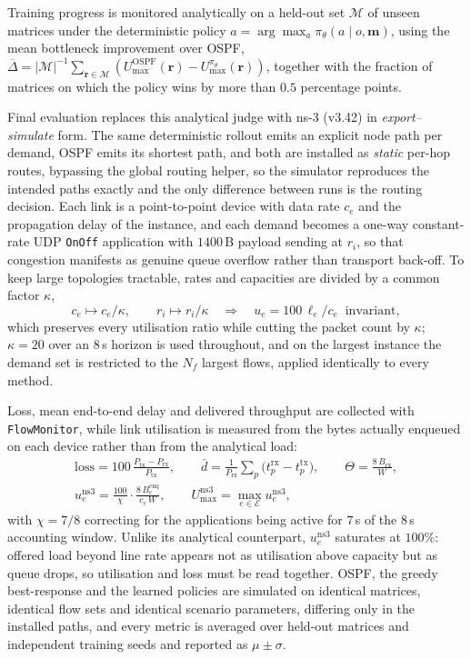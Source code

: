 Training progress is monitored analytically on a held-out set $\mathcal{M}$ of unseen matrices
under the deterministic policy $a = \arg\max_a \pi_\theta(a\mid o,\mathbf{m})$, using the mean
bottleneck improvement over OSPF,
$\overline{\Delta} = |\mathcal{M}|^{-1}\sum_{\mathbf{r}\in\mathcal{M}}
(U^{\mathrm{OSPF}}_{\max}(\mathbf{r}) - U^{\pi_\theta}_{\max}(\mathbf{r}))$, together with the
fraction of matrices on which the policy wins by more than $0.5$ percentage points.

Final evaluation replaces this analytical judge with \mbox{ns-3} (v3.42) in
\emph{export--simulate} form. The same deterministic rollout emits an explicit node path per
demand, OSPF emits its shortest path, and both are installed as \emph{static} per-hop routes,
bypassing the global routing helper, so the simulator reproduces the intended paths exactly and
the only difference between runs is the routing decision. Each link is a point-to-point device
with data rate $c_e$ and the propagation delay of the instance, and each demand becomes a one-way
constant-rate UDP \texttt{OnOff} application with $1400$\,B payload sending at $r_i$, so that
congestion manifests as genuine queue overflow rather than transport back-off. To keep large
topologies tractable, rates and capacities are divided by a common factor $\kappa$,
\begin{equation}
c_e \mapsto c_e/\kappa, \qquad r_i \mapsto r_i/\kappa
\quad\Longrightarrow\quad
u_e = 100\,\ell_e/c_e \;\; \text{invariant},
\end{equation}
which preserves every utilisation ratio while cutting the packet count by $\kappa$; $\kappa = 20$
over an $8$\,s horizon is used throughout, and on the largest instance the demand set is
restricted to the $N_f$ largest flows, applied identically to every method.

Loss, mean end-to-end delay and delivered throughput are collected with \texttt{FlowMonitor},
while link utilisation is measured from the bytes actually enqueued on each device rather than
from the analytical load:
\begin{equation}
\begin{gathered}
\mathrm{loss} = 100\,\frac{P_{\mathrm{tx}} - P_{\mathrm{rx}}}{P_{\mathrm{tx}}},
\qquad
\bar{d} = \frac{1}{P_{\mathrm{rx}}}\sum_{p}\bigl(t^{\mathrm{rx}}_p - t^{\mathrm{tx}}_p\bigr),
\qquad
\Theta = \frac{8\,B_{\mathrm{rx}}}{W}, \\[3pt]
u^{\mathrm{ns3}}_e = \frac{100}{\chi}\cdot\frac{8\,B^{\mathrm{enq}}_e}{c_e\,W},
\qquad
U^{\mathrm{ns3}}_{\max} = \max_{e\in\mathcal{E}} u^{\mathrm{ns3}}_e ,
\end{gathered}
\end{equation}
with $\chi = 7/8$ correcting for the applications being active for $7$\,s of the $8$\,s accounting
window. Unlike its analytical counterpart, $u^{\mathrm{ns3}}_e$ saturates at $100\%$: offered load
beyond line rate appears not as utilisation above capacity but as queue drops, so utilisation and
loss must be read together. OSPF, the greedy best-response and the learned policies are simulated
on identical matrices, identical flow sets and identical scenario parameters, differing only in
the installed paths, and every metric is averaged over held-out matrices and independent training
seeds and reported as $\mu \pm \sigma$.

